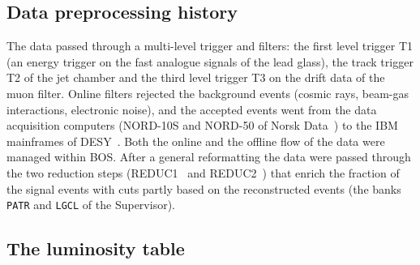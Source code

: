 \subsection{Data preprocessing history}
The data passed through a multi-level trigger and filters: the first level trigger T1 (an energy trigger on the fast analogue
signals of the lead glass), the track trigger T2 of the jet chamber and the third level trigger T3 on the drift data of the muon
filter. Online filters rejected the background events (cosmic rays, beam-gas interactions, electronic noise), and the accepted events
went from the data acquisition computers (NORD-10S and NORD-50 of Norsk Data~\cite{Wiki:Nord}) to the IBM mainframes of DESY~\cite{Wiki:IBM370}.
Both the online and the offline flow of the data were managed within BOS. After a general reformatting the data were passed through the
two reduction steps (REDUC1~\cite{JCN:38} and REDUC2~\cite{JCN:43}) that enrich the fraction of the signal events with cuts partly based on the
reconstructed events (the banks \texttt{PATR} and \texttt{LGCL} of the Supervisor).

\subsection{The luminosity table}
\label{sec:lumi}

